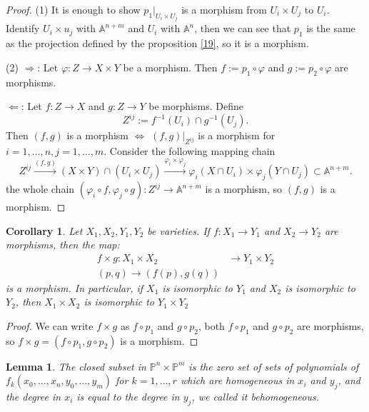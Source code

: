 \documentclass{amsart}
\theoremstyle{plain}
\newtheorem{corollary}{Corollary}
\newtheorem{lemma}{Lemma}
\theoremstyle{definition}
\theoremstyle{remark}
\numberwithin{equation}{section}
\begin{document}
\begin{proof}
	(1) It is enough to show $ p_1|_{U_i\times U_j} $ is a morphism from $ U_i\times U_j $ to $ U_i $. Identify $ U_i\times u_j $ with $ \mathbb{A}^{n+m} $ and $ U_i $ with $ \mathbb{A}^{n} $, then we can see that $ p_1 $ is the same as  the projection defined by the proposition \ref{19}, so it is a morphism.
	
	(2) $ \Rightarrow $: Let $ \varphi:Z\to X\times Y $ be a morphism. Then $ f:=p_1\circ \varphi $ and $ g:=p_2\circ \varphi $ are morphisms.
	
	$ \Leftarrow $: Let $ f:Z\to X $ and $ g:Z\to Y $ be morphisms. Define 
	\begin{equation*}
	Z^{ij}:=f^{-1}(U_i)\cap g^{-1}(U_j).
	\end{equation*}
	Then $ (f,g) $ is a morphism $ \Leftrightarrow $ $ (f,g)|_{Z^{ij}} $ is a morphism for $ i=1,\dots,n,j=1,\dots,m $. Consider the following mapping chain
	\begin{equation*}
		Z^{ij}\xrightarrow{(f,g)} (X\times Y)\cap (U_i\times U_j)\xrightarrow{\varphi_i\times \varphi_j}\varphi_i(X\cap U_i)\times \varphi_j(Y\cap U_j)\subset \mathbb{A}^{n+m}.
	\end{equation*}
	the whole chain $ (\varphi_i\circ f,\varphi_j\circ g):Z^{ij}\to \mathbb{A}^{n+m} $ is a morphism, so $ (f,g) $ is a morphism.
\end{proof}
\begin{corollary}
	Let $ X_1,X_2,Y_1,Y_2 $ be varieties. If $ f:X_1\to Y_1 $ and $ X_2\to Y_2 $ are morphisms, then the map:
	\begin{align*}
		f\times g :X_1\times X_2 & \to Y_1\times Y_2\\
		(p,q)\to (f(p),g(q))
	\end{align*}
	is a morphism. In particular, if $ X_1 $ is isomorphic to $ Y_1 $ and $ X_2 $ is isomorphic to $ Y_2 $, then $ X_1\times X_2 $ is isomorphic to $ Y_1\times Y_2 $
\end{corollary}
\begin{proof}
	We can write $ f\times g $ as $ f\circ p_1 $ and $ g\circ p_2 $, both $ f\circ p_1 $ and $ g\circ p_2 $ are morphisms, so $ f\times g =(f\circ p_1,g\circ p_2) $ is a morphism. 
\end{proof}
\begin{lemma}
	The closed subset in $ \mathbb{P}^n\times \mathbb{P}^m $ is the zero set of sets of polynomials of $ f_k(x_0,\dots,x_n,y_0,\dots,y_m) $ for $ k=1,\dots,r $ which are homogeneous in  $ x_i $ and $ y_j $, and the degree in $ x_i $ is equal to the degree in $ y_j $, we called it behomogeneous.
\end{lemma}
\end{document}
